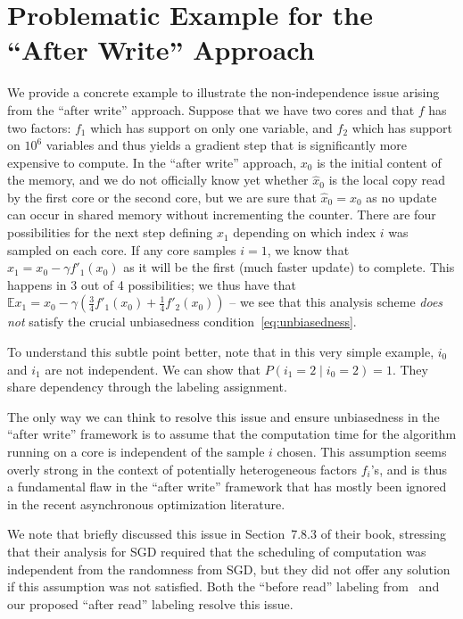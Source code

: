 \documentclass[twoside]{article}
\newcommand{\stepsize}{\gamma}
\newcommand{\E}{\mathbb{E}}
\begin{document}
\section{Problematic Example for the ``After Write'' Approach} \label{apx:ProblematicExample}
We provide a concrete example to illustrate the non-independence issue arising from the ``after write'' approach. 
Suppose that we have two cores and that $f$ has two factors: $f_1$ which has support on only one variable, and $f_2$ which has support on $10^6$ variables and thus yields a gradient step that is significantly more expensive to compute. 
In the ``after write'' approach, $x_0$ is the initial content of the memory, and we do not officially know yet whether $\hat{x}_0$ is the local copy read by the first core or the second core, but we are sure that $\hat{x}_0 = x_0$ as no update can occur in shared memory without incrementing the counter. 
There are four possibilities for the next step defining $x_1$ depending on which index $i$ was sampled on each core. 
If any core samples $i=1$, we know that $x_1 = x_0 - \stepsize f'_1(x_0)$ as it will be the first (much faster update) to complete. 
This happens in 3 out of 4 possibilities; we thus have that $\E x_1 = x_0 - \stepsize (\frac{3}{4} f'_1(x_0) + \frac{1}{4} f '_2(x_0))$ -- we see that this analysis scheme \emph{does not} satisfy the crucial unbiasedness condition~\eqref{eq:unbiasedness}. 

To understand this subtle point better, note that in this very simple example, $i_0$ and $i_1$ are not independent. We can show that $P(i_1=2 \mid i_0=2) =1$. They share dependency through the labeling assignment.
 
The only way we can think to resolve this issue and ensure unbiasedness in the ``after write'' framework is to assume that the computation time for the algorithm running on a core is independent of the sample $i$ chosen.
This assumption seems overly strong in the context of potentially heterogeneous factors $f_i$'s, and is thus a fundamental flaw in the ``after write'' framework that has mostly been ignored in the recent asynchronous optimization literature. 

We note that \citet{bertsekasParalle1989} briefly discussed this issue in Section~7.8.3 of their book, stressing that their analysis for SGD required that the scheduling of computation was independent from the randomness from SGD, but they did not offer any solution if this assumption was not satisfied. Both the ``before read'' labeling from~\citet{mania} and our proposed ``after read'' labeling resolve this issue.
\end{document}
